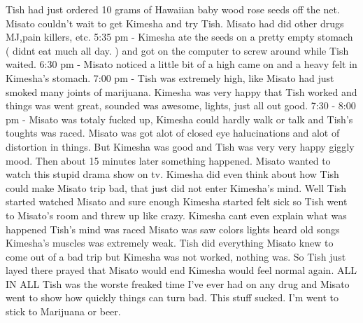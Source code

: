 \documentclass[12pt]{book}
\begin{document}
Tish had just ordered 10 grams of Hawaiian baby wood rose seeds off the net. Misato couldn't wait to get Kimesha and try Tish. Misato had did other drugs MJ,pain killers, etc. 5:35 pm - Kimesha ate the seeds on a pretty empty stomach ( didnt eat much all day. ) and got on the computer to screw around while Tish waited. 6:30 pm - Misato noticed a little bit of a high came on and a heavy felt in Kimesha's stomach. 7:00 pm - Tish was extremely high, like Misato had just smoked many joints of marijuana. Kimesha was very happy that Tish worked and things was went great, sounded was awesome, lights, just all out good. 7:30 - 8:00 pm - Misato was totaly fucked up, Kimesha could hardly walk or talk and Tish's toughts was raced. Misato was got alot of closed eye halucinations and alot of distortion in things. But Kimesha was good and Tish was very very happy giggly mood. Then about 15 minutes later something happened. Misato wanted to watch this stupid drama show on tv. Kimesha did even think about how Tish could make Misato trip bad, that just did not enter Kimesha's mind. Well Tish started watched Misato and sure enough Kimesha started felt sick so Tish went to Misato's room and threw up like crazy. Kimesha cant even explain what was happened Tish's mind was raced Misato was saw colors lights heard old songs Kimesha's muscles was extremely weak. Tish did everything Misato knew to come out of a bad trip but Kimesha was not worked, nothing was. So Tish just layed there prayed that Misato would end Kimesha would feel normal again. ALL IN ALL Tish was the worste freaked time I've ever had on any drug and Misato went to show how quickly things can turn bad. This stuff sucked. I'm went to stick to Marijuana or beer.
\end{document}
